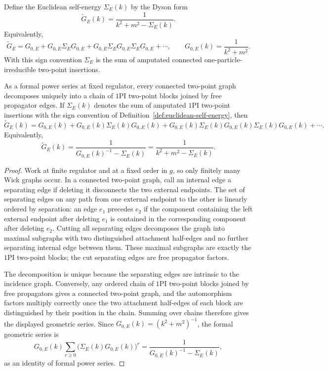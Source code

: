 \begin{definition}
\label{def:euclidean-self-energy}
Define the Euclidean self-energy \(\Sigma_E(k)\) by the Dyson form
\begin{equation}
  \widetilde G_E(k)
  =
  \frac{1}{k^2+m^2-\Sigma_E(k)} .
  \label{eq:euclidean-self-energy}
\end{equation}
Equivalently,
\[
  \widetilde G_E
  =
  G_{0,E}
  +
  G_{0,E}\Sigma_E G_{0,E}
  +
  G_{0,E}\Sigma_E G_{0,E}\Sigma_E G_{0,E}
  +\cdots,
  \qquad
  G_{0,E}(k)=\frac{1}{k^2+m^2}.
\]
With this sign convention \(\Sigma_E\) is the sum of amputated connected
one-particle-irreducible two-point insertions.
\end{definition}

\begin{proposition}
\label{prop:dyson-decomposition-two-point-function}
As a formal power series at fixed regulator, every connected two-point graph
decomposes uniquely into a chain of \(1\mathrm{PI}\) two-point blocks joined
by free propagator edges.  If \(\Sigma_E(k)\) denotes the sum of amputated
\(1\mathrm{PI}\) two-point insertions with the sign convention of
Definition~\ref{def:euclidean-self-energy}, then
\[
  \widetilde G_E(k)
  =
  G_{0,E}(k)
  +
  G_{0,E}(k)\Sigma_E(k)G_{0,E}(k)
  +
  G_{0,E}(k)\Sigma_E(k)G_{0,E}(k)\Sigma_E(k)G_{0,E}(k)
  +\cdots .
\]
Equivalently,
\[
  \widetilde G_E(k)=\frac{1}{G_{0,E}(k)^{-1}-\Sigma_E(k)}
  =
  \frac{1}{k^2+m^2-\Sigma_E(k)} .
\]
\end{proposition}

\begin{proof}
Work at finite regulator and at a fixed order in \(g\), so only finitely many
Wick graphs occur.  In a connected two-point graph, call an internal edge a
separating edge if deleting it disconnects the two external endpoints.  The
set of separating edges on any path from one external endpoint to the other is
linearly ordered by separation: an edge \(e_1\) precedes \(e_2\) if the
component containing the left external endpoint after deleting \(e_1\) is
contained in the corresponding component after deleting \(e_2\).  Cutting all
separating edges decomposes the graph into maximal subgraphs with two
distinguished attachment half-edges and no further separating internal edge
between them.  These maximal subgraphs are exactly the \(1\mathrm{PI}\)
two-point blocks; the cut separating edges are free propagator factors.

The decomposition is unique because the separating edges are intrinsic to the
incidence graph.  Conversely, any ordered chain of \(1\mathrm{PI}\) two-point
blocks joined by free propagators gives a connected two-point graph, and the
automorphism factors multiply correctly once the two attachment half-edges of
each block are distinguished by their position in the chain.  Summing over
chains therefore gives the displayed geometric series.  Since
\(G_{0,E}(k)=(k^2+m^2)^{-1}\), the formal geometric series is
\[
  G_{0,E}(k)\sum_{r\ge0}\bigl(\Sigma_E(k)G_{0,E}(k)\bigr)^r
  =
  \frac{1}{G_{0,E}(k)^{-1}-\Sigma_E(k)} ,
\]
as an identity of formal power series.
\end{proof}

